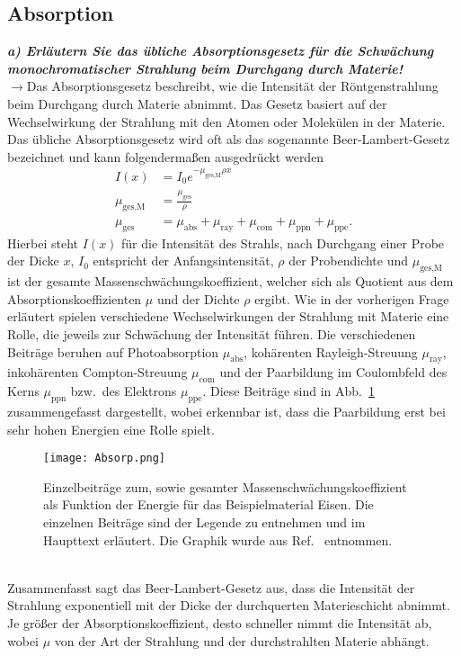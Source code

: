 \subsection{\label{subsec:FZV3}Absorption}
\textbf{\textit{a) Erläutern Sie das übliche Absorptionsgesetz für die Schwächung monochromatischer
Strahlung beim Durchgang durch Materie!}}\\
$\rightarrow$Das Absorptionsgesetz beschreibt, wie die Intensität der Röntgenstrahlung 
beim Durchgang durch Materie abnimmt. Das Gesetz basiert auf der Wechselwirkung der Strahlung mit den Atomen 
oder Molekülen in der Materie. Das übliche Absorptionsgesetz wird oft als das sogenannte Beer-Lambert-Gesetz
bezeichnet und kann folgendermaßen ausgedrückt werden \cite{Kristall}
\begin{align}
    I(x) &= I_{0}e^{-\mu_{\text{ges,M}}\rho x} \label{eq:massI}\\
    \mu_{\text{ges,M}} &= \frac{\mu_{\text{ges}}}{\rho} \\
    \mu_{\text{ges}} &= \mu_{\text{abs}} + \mu_{\text{ray}} + \mu_{\text{com}} + \mu_{\text{ppn}} + \mu_{\text{ppe}}.
\end{align}
Hierbei steht $I(x)$ für die Intensität des Strahls, nach Durchgang einer Probe der Dicke $x$, $I_{0}$ entspricht der
Anfangsintensität, $\rho$ der Probendichte und $\mu_{\text{ges,M}}$ ist der gesamte Massenschwächungskoeffizient, 
welcher sich als Quotient aus dem Absorptionskoeffizienten $\mu$ und der Dichte $\rho$ ergibt. 
Wie in der vorherigen Frage erläutert spielen verschiedene Wechselwirkungen der Strahlung mit Materie eine Rolle, die 
jeweils zur Schwächung der Intensität führen. Die verschiedenen Beiträge beruhen auf Photoabsorption $\mu_{\text{abs}}$, 
kohärenten Rayleigh-Streuung $\mu_{\text{ray}}$, inkohärenten Compton-Streuung $\mu_{\text{com}}$ und der 
Paarbildung im Coulombfeld des Kerns $\mu_{\text{ppn}}$ bzw.~des Elektrons $\mu_{\text{ppe}}$.
Diese Beiträge sind in Abb.~\ref{fig:absorp} zusammengefasst dargestellt, wobei erkennbar ist, dass 
die Paarbildung erst bei sehr hohen Energien eine Rolle spielt.
\begin{figure}[h!]
    \centering
    \texttt{[image: Absorp.png]}
    \caption{\label{fig:absorp}Einzelbeiträge zum, sowie gesamter Massenschwächungskoeffizient
    als Funktion der Energie für das Beispielmaterial Eisen. Die einzelnen Beiträge sind der Legende zu 
    entnehmen und im Haupttext erläutert. Die Graphik wurde aus Ref.~\cite{Absorp} entnommen.}
\end{figure} \FloatBarrier \,\\
Zusammenfasst sagt das Beer-Lambert-Gesetz aus, dass die Intensität der Strahlung exponentiell mit der Dicke der 
durchquerten Materieschicht abnimmt. Je größer der Absorptionskoeffizient, desto schneller nimmt die Intensität ab, 
wobei $\mu$ von der Art der Strahlung und der durchstrahlten Materie abhängt. \\

